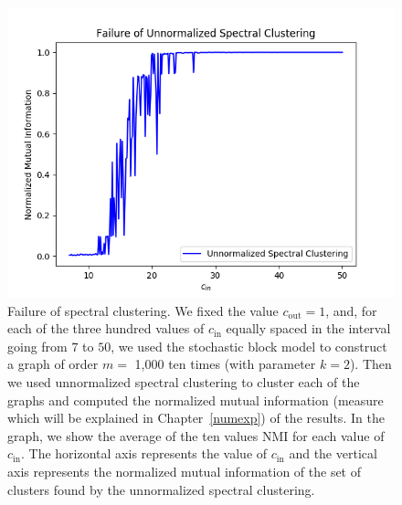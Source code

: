 \begin{figure}[h]
\begin{center}
\includegraphics[width=14cm]{figures/spec_fail.png}
\end{center}
   \caption[Failure of spectral clustering]{Failure of spectral clustering. We fixed the value $c_\text{out} = 1$, and, for each of the three hundred values of $c_\text{in}$ equally spaced in the interval going from $7$ to $50$,  we used the stochastic block model to construct a graph of order $m =$ 1,000 ten times (with parameter $k=2$). Then we used unnormalized spectral clustering to cluster each of the graphs and computed the normalized mutual information (measure which will be explained in Chapter~\vref{numexp}) of the results. In the graph, we show the average of the ten values NMI for each value of $c_\text{in}$. The horizontal axis represents the value of $c_\text{in}$ and the vertical axis represents the normalized mutual information of the set of clusters found by the unnormalized spectral clustering.}
   \label{spec_fail}
\end{figure}

